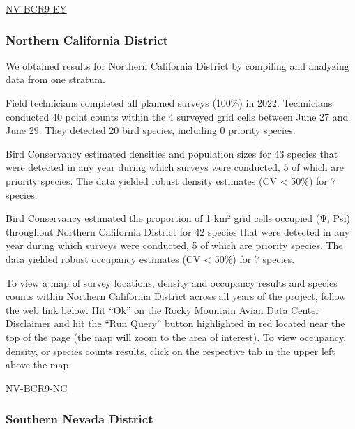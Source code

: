 \documentclass[
  letterpaper,
  DIV=11,
  numbers=noendperiod,
  oneside]{scrreprt}
\begin{document}
\href{http://www.rmbo.org/new_site/adc/QueryWindow.aspx\#N4IgzgLgTghhCuBbEAuABCAcgNQLQCEBhAJQE5cBRATXX3igFMZ40B7AMzQBkYA7AEzQBZPjADmDRA14Q0uNBQA2ATzQARAJaQoGgMYQQAXyA===}{NV-BCR9-EY}

\hypertarget{northern-california-district-1}{%
\subsubsection{Northern California
District}\label{northern-california-district-1}}

We obtained results for Northern California District by compiling and
analyzing data from one stratum.

Field technicians completed all planned surveys (100\%) in 2022.
Technicians conducted 40 point counts within the 4 surveyed grid cells
between June 27 and June 29. They detected 20 bird species, including 0
priority species.

Bird Conservancy estimated densities and population sizes for 43 species
that were detected in any year during which surveys were conducted, 5 of
which are priority species. The data yielded robust density estimates
(CV \textless{} 50\%) for 7 species.

Bird Conservancy estimated the proportion of 1 km² grid cells occupied
(Ψ, Psi) throughout Northern California District for 42 species that
were detected in any year during which surveys were conducted, 5 of
which are priority species. The data yielded robust occupancy estimates
(CV \textless{} 50\%) for 7 species.

To view a map of survey locations, density and occupancy results and
species counts within Northern California District across all years of
the project, follow the web link below. Hit ``Ok'' on the Rocky Mountain
Avian Data Center Disclaimer and hit the ``Run Query'' button
highlighted in red located near the top of the page (the map will zoom
to the area of interest). To view occupancy, density, or species counts
results, click on the respective tab in the upper left above the map.

\href{http://www.rmbo.org/new_site/adc/QueryWindow.aspx\#N4IgzgLgTghhCuBbEAuABCAcgNQLQCEBhAJQE5dND194oBTGeNAewDM0AZGAOwBM0AsjxgBzOojrcIaXGkzMoEABZ0o3NIRgAbAJasF3HTDQARHZCg6AxhBABfIA}{NV-BCR9-NC}

\hypertarget{southern-nevada-district}{%
\subsubsection{Southern Nevada
District}\label{southern-nevada-district}}
\end{document}
